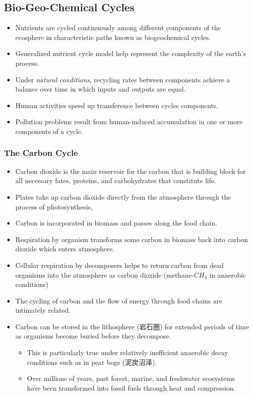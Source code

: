 \documentclass[10pt]{article}
\begin{document}
\subsection{Bio-Geo-Chemical Cycles}
\begin{itemize}
    \item Nutrients are cycled continuously among different components of the ecosphere in characteristic paths known as biogeochemical cycles. 
    \item Generalized nutrient cycle model help represent the complexity of the earth's process.
    \item Under \textit{natural conditions}, recycling rates between components achieve a balance over time in which inputs and outputs are equal. 
    \item Human activities speed up transference between cycles components.
    \item Pollution problems result from human-induced accumulation in one or more components of a cycle. 
\end{itemize}

\subsubsection{The Carbon Cycle}
\begin{itemize}
    \item Carbon dioxide is the main reservoir for the carbon that is building block for all necessary fates, proteins, and carbohydrates that constitute life. 
    \item Plates take up carbon dioxide directly from the atmosphere through the process of photosynthesis, 
    \item Carbon is incorporated in biomass and passes along the food chain.
    \item Respiration by organism transforms some carbon in biomass back into carbon dioxide which enters atmosphere. 
    \item Cellular respiration by decomposers helps to return carbon from dead organisms into the atmosphere as carbon dioxide (methane-$CH_4$ in anaerobic conditions)
    \item The cycling of carbon and the flow of energy through food chains are intimately related.
    \item Carbon can be stored in the lithosphere (岩石圈) for extended periods of time as organisms become buried before they decompose. 
    \begin{itemize}
        \item This is particularly true under relatively inefficient anaerobic decay conditions such as in peat bogs (泥炭沼泽).
        \item Over millions of years, past forest, marine, and freshwater ecosystems have been transformed into fossil fuels through heat and compression. 
    \end{itemize}
\end{itemize}
\end{document}
